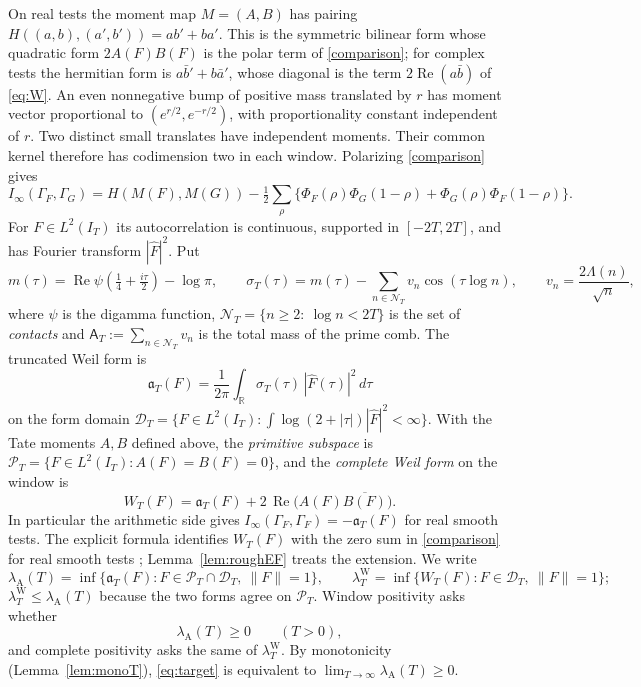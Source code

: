 \documentclass[10pt]{amsart}
\theoremstyle{definition}
\theoremstyle{remark}
\newcommand{\R}{\mathbb R}
\newcommand{\Rel}{\operatorname{Re}}
\newcommand{\PT}{\mathcal P_T}
\newcommand{\IT}{I_T}
\newcommand{\lamW}{\lambda^{\mathrm W}_T}
\newcommand{\lamA}{\lambda_{\mathrm A}(T)}
\newcommand{\sT}{\sigma_T}
\newcommand{\Fh}{\widehat F}
\newcommand{\NT}{\mathcal N_T}
\newcommand{\Aconst}{\mathsf A_T}
\begin{document}
On real tests the moment map $M=(A,B)$ has pairing
$H((a,b),(a',b'))=ab'+ba'$. This is the symmetric bilinear form whose
quadratic form $2A(F)B(F)$ is the polar term of \eqref{comparison}; for
complex tests the hermitian form is $a\bar b'+b\bar a'$, whose diagonal is the term $2\Rel(a\bar b)$ of \eqref{eq:W}.
An even nonnegative bump of positive mass translated by $r$ has moment
vector proportional to $(e^{r/2},e^{-r/2})$, with proportionality
constant independent of $r$. Two distinct small translates have
independent moments. Their common kernel therefore has codimension
two in each window. Polarizing \eqref{comparison} gives
\[
 I_\infty(\Gamma_F,\Gamma_G)=H(M(F),M(G))-
 \tfrac12\sum_\rho\{\Phi_F(\rho)\Phi_G(1-\rho)+\Phi_G(\rho)\Phi_F(1-\rho)\}.
\]
For $F\in L^2(\IT)$ its autocorrelation is continuous, supported
in $[-2T,2T]$, and has Fourier transform $|\Fh|^2$. Put
\begin{equation}\label{eq:symbol}
m(\tau)=\Rel\psi\!\left(\tfrac14+\tfrac{i\tau}{2}\right)-\log\pi,\qquad
\sT(\tau)=m(\tau)-\sum_{n\in\NT}v_n\cos(\tau\log n),\qquad v_n=\frac{2\Lambda(n)}{\sqrt n},
\end{equation}
where $\psi$ is the digamma function, $\NT=\{n\ge2:\ \log n<2T\}$ is the set of \emph{contacts} and
$\Aconst:=\sum_{n\in\NT}v_n$ is the total mass of the prime comb. The truncated Weil form is
\begin{equation}\label{eq:form}
\mathfrak a_T(F)=\frac1{2\pi}\int_\R\sT(\tau)\,|\Fh(\tau)|^2\,d\tau
\end{equation}
on the form domain $\mathcal D_T=\{F\in L^2(\IT):\int\log(2+|\tau|)|\Fh|^2<\infty\}$. With the Tate
moments $A,B$ defined above, the \emph{primitive subspace} is
$\PT=\{F\in L^2(\IT):A(F)=B(F)=0\}$, and the \emph{complete Weil form} on the window is
\begin{equation}\label{eq:W}
W_T(F)=\mathfrak a_T(F)+2\,\Rel\big(A(F)\overline{B(F)}\big).
\end{equation}
In particular the arithmetic side gives $I_\infty(\Gamma_F,\Gamma_F)=-\mathfrak a_T(F)$ for real smooth tests. The explicit formula identifies $W_T(F)$ with the zero sum in
\eqref{comparison} for real smooth tests \cite{Weil52,Bombieri2000};
Lemma~\ref{lem:roughEF} treats the extension. We write
\[
\lamA=\inf\{\mathfrak a_T(F):F\in\PT\cap\mathcal D_T,\ \|F\|=1\},\qquad
\lamW=\inf\{W_T(F):F\in\mathcal D_T,\ \|F\|=1\};
\]
$\lamW\le\lamA$ because the two forms agree on $\PT$. Window positivity asks whether
\begin{equation}\label{eq:target}
\lamA\ge0\qquad(T>0),
\end{equation}
and complete positivity asks the same of $\lamW$. By monotonicity
(Lemma~\ref{lem:monoT}), \eqref{eq:target} is equivalent to
$\lim_{T\to\infty}\lamA\ge0$.
\end{document}
